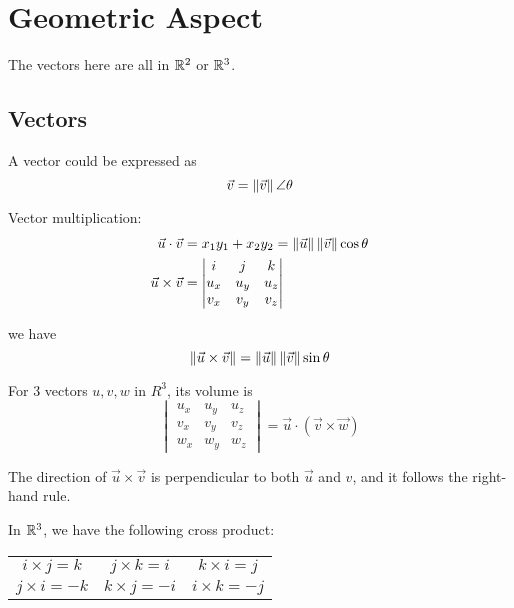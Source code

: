 \chapter{Geometric Aspect}

The vectors here are all in $\mathbb{R}^2$ or $\mathbb{R}^3$.

\section{Vectors}

A vector could be expressed as 
\begin{equation}
    \vec{v} = \left\Vert {\vec{v}} \right\Vert \angle \theta
\end{equation}

Vector multiplication:
\begin{equation}
    \begin{aligned}
        \vec{u} \cdot \vec{v} &= x_1 y_1 + x_2 y_2 = \left\Vert {\vec{u}} \right\Vert \left\Vert {\vec{v}} \right\Vert \cos \theta \\
        \vec{u} \times \vec{v} &= \begin{vmatrix}
            i & j & k \\
            u_x & u_y & u_z \\
            v_x & v_y & v_z
        \end{vmatrix}
    \end{aligned}    
\end{equation}

we have
\begin{equation}
    \left\Vert {\vec{u} \times \vec{v}} \right\Vert = \left\Vert {\vec{u}} \right\Vert \left\Vert {\vec{v}} \right\Vert \sin \theta
\end{equation}

For 3 vectors $u, v, w$ in $R^3$, its volume is
\begin{equation}
    \begin{vmatrix}
            u_x & u_y & u_z \\
            v_x & v_y & v_z \\
            w_x & w_y & w_z
    \end{vmatrix} = \vec{u} \cdot (\vec{v} \times \vec{w})
\end{equation}

The direction of $\vec{u} \times \vec{v}$ is perpendicular to both $\vec{u}$ and ${v}$, and it follows the right-hand rule.

In $\mathbb{R}^3$, we have the following cross product:

\begin{table}[H]
\centering
\begin{tabular}[t]{ccc}
    $i \times j = k$ & $j \times k = i$ & $k \times i = j$ \\
    $j \times i = -k$ & $k \times j = -i$ & $i \times k = -j$
\end{tabular}
\end{table}

